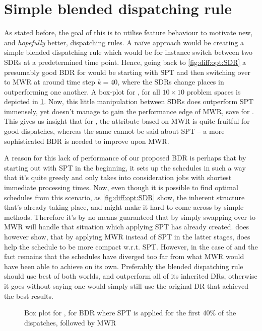 \section{Simple blended dispatching rule}\label{sec:diff:opt:bdr}
As stated before, the goal of this  is to utilise feature behaviour to motivate new, and \emph{hopefully} better, dispatching rules. 
A na\"ive approach would be creating a simple blended dispatching rule which would be for instance switch between two SDRs at a predetermined time point. Hence, going back to \cref{fig:diff:opt:SDR} a presumably good BDR for   would be starting with SPT and then switching over to MWR at around time step $k=40$, where the SDRs change places in outperforming one another. A box-plot for \namerho, for all $10\times10$ problem spaces is depicted in \cref{fig:diff:boxplot:BDR}. Now, this little manipulation between SDRs does outperform SPT immensely, yet doesn't manage to gain the performance edge of MWR, save for . This gives us insight that for \jsp, the attribute based on MWR is quite fruitful for good dispatches, whereas the same cannot be said about SPT -- a more sophisticated BDR is needed to improve upon MWR. 

A reason for this lack of performance of our proposed BDR is perhaps that by starting out with SPT in the beginning, it sets up the schedules in such a way that it's quite greedy and only takes into consideration jobs with shortest immediate processing times. Now, even though it is possible to find optimal schedules from this scenario, as \cref{fig:diff:opt:SDR} show, the inherent structure that's already taking place, and might make it hard to come across by simple methods. Therefore it's by no means guaranteed that by simply swapping over to MWR will handle that situation which applying SPT has already created.  does however show, that by applying MWR instead of SPT in the latter stages, does help the schedule to be more compact w.r.t. SPT. However, in the case of  and  the fact remains that the schedules have diverged too far from what MWR would have been able to achieve on its own. Preferably the blended dispatching rule should use  best of both worlds, and outperform all of its inherited DRs, otherwise it goes without saying one would simply still use the original DR that achieved the best results.

\begin{figure}
\centering
{}
\caption{Box plot for \namerho, for BDR where SPT is applied for the first 40\% of the dispatches, followed by MWR}
\label{fig:diff:boxplot:BDR}
\end{figure}

